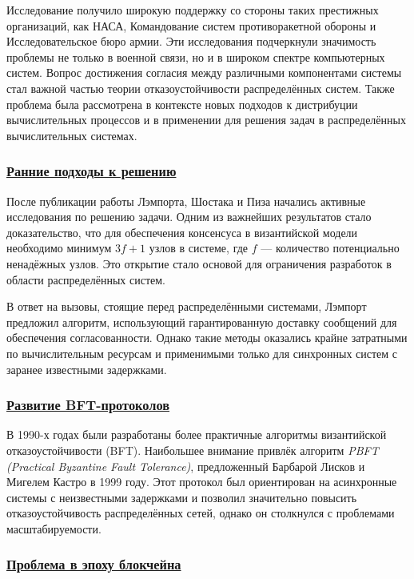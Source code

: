 Исследование получило широкую поддержку со стороны таких престижных организаций, как НАСА, Командование систем противоракетной обороны и Исследовательское бюро армии. Эти исследования подчеркнули значимость проблемы не только в военной связи, но и в широком спектре компьютерных систем. Вопрос достижения согласия между различными компонентами системы стал важной частью теории отказоустойчивости распределённых систем. Также проблема была рассмотрена в контексте новых подходов к дистрибуции вычислительных процессов и в применении для решения задач в распределённых вычислительных системах.~\cite{plisio}

\subsubsection*{\underline{Ранние подходы к решению}}

\hspace{1.25cm} После публикации работы Лэмпорта, Шостака и Пиза начались активные исследования по решению задачи. Одним из важнейших результатов стало доказательство, что для обеспечения консенсуса в византийской модели необходимо минимум \(3f + 1\) узлов в системе, где \(f\) — количество потенциально ненадёжных узлов. Это открытие стало основой для ограничения разработок в области распределённых систем.

В ответ на вызовы, стоящие перед распределёнными системами, Лэмпорт предложил алгоритм, использующий гарантированную доставку сообщений для обеспечения согласованности. Однако такие методы оказались крайне затратными по вычислительным ресурсам и применимыми только для синхронных систем с заранее известными задержками.

\subsubsection*{\underline{Развитие BFT-протоколов}}

\hspace{1.25cm} В 1990-х годах были разработаны более практичные алгоритмы византийской отказоустойчивости (BFT). Наибольшее внимание привлёк алгоритм \textit{PBFT (Practical Byzantine Fault Tolerance)}, предложенный Барбарой Лисков и Мигелем Кастро в 1999 году. Этот протокол был ориентирован на асинхронные системы с неизвестными задержками и позволил значительно повысить отказоустойчивость распределённых сетей, однако он столкнулся с проблемами масштабируемости.

\subsubsection*{\underline{Проблема в эпоху блокчейна}}

